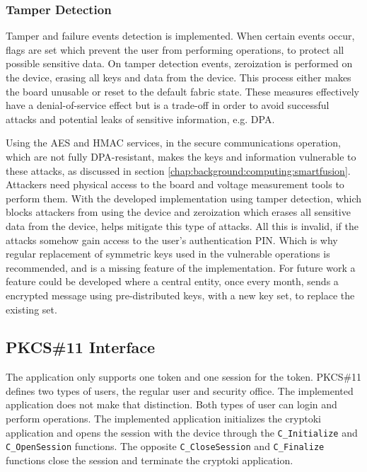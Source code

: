 \subsubsection*{Tamper Detection}

Tamper and failure events detection is implemented. When certain events occur, flags are set which prevent the user from performing operations, to protect all possible sensitive data.
On tamper detection events, zeroization is performed on the device, erasing all keys and data from the device. This process either makes the board unusable or reset to the default fabric state.
These measures effectively have a denial-of-service effect but is a trade-off in order to avoid successful attacks and potential leaks of sensitive information, e.g. \ac{DPA}.

Using the AES and HMAC services, in the secure communications operation, which are not fully DPA-resistant, makes the keys and information vulnerable to these attacks, as discussed in section \ref{chap:background:computing:smartfusion}.
Attackers need physical access to the board and voltage measurement tools to perform them.
With the developed implementation using tamper detection, which blocks attackers from using the device and zeroization which erases all sensitive data from the device, helps mitigate this type of attacks.
All this is invalid, if the attacks somehow gain access to the user's authentication PIN.
Which is why regular replacement of symmetric keys used in the vulnerable operations is recommended, and is a missing feature of the implementation.
For future work a feature could be developed where a central entity, once every month, sends a encrypted message using pre-distributed keys, with a new key set, to replace the existing set.


\subsection{PKCS\#11 Interface}\label{chap:implementation:app:interface}

The application only supports one token and one session for the token.
PKCS\#11 defines two types of users, the regular user and security office. The implemented application does not make that distinction. Both types of user can login and perform operations.
The implemented application initializes the cryptoki application and opens the session with the device through the \texttt{C\_Initialize} and \texttt{C\_OpenSession} functions.
The opposite \texttt{C\_CloseSession} and \texttt{C\_Finalize} functions close the session and terminate the cryptoki application.

